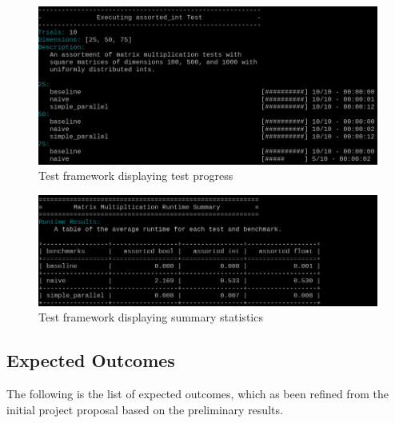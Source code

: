 \documentclass[oneside]{article}
\begin{document}
\begin{figure}[ht!]
\centering
\includegraphics[width=\textwidth]{framework-progress}
\caption{Test framework displaying test progress}
\label{fig:progress}
\end{figure}

\begin{figure}[ht!]
\centering
\includegraphics[width=\textwidth]{framework-summary}
\caption{Test framework displaying summary statistics}
\label{fig:summary}
\end{figure}



\subsection{Expected Outcomes}

The following is the list of expected outcomes, which as been refined from the initial project proposal based on the preliminary results.
\end{document}
